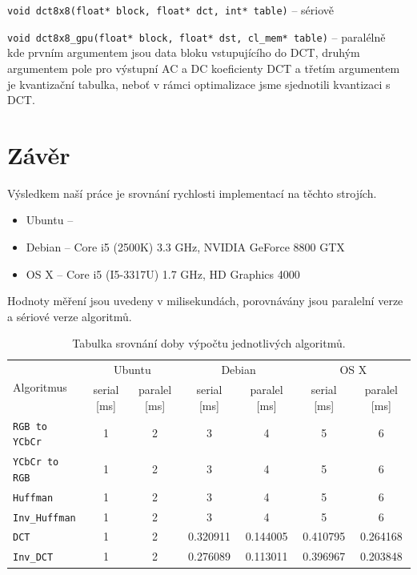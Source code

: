 \documentclass[a4paper,11pt]{article}
\begin{document}
\texttt{void dct8x8(float* block, float* dct, int* table)} -- sériově

\texttt{void dct8x8\_gpu(float* block, float* dst, cl\_mem* table)} -- paralélně\\
kde prvním argumentem jsou data bloku vstupujícího do DCT, druhým argumentem pole pro výstupní AC a DC koeficienty DCT
a třetím argumentem je kvantizační tabulka, neboť v rámci optimalizace jsme sjednotili kvantizaci s DCT.


\section{Závěr}
Výsledkem naší práce je srovnání rychlosti implementací na těchto strojích.
\begin{itemize}
\item Ubuntu -- 
\item Debian -- Core i5 (2500K) 3.3 GHz, NVIDIA GeForce 8800 GTX
\item OS X -- Core i5 (I5-3317U) 1.7 GHz, HD Graphics 4000
\end{itemize}
Hodnoty měření jsou uvedeny v milisekundách, porovnávány jsou paralelní verze a sériové verze algoritmů.

\begin{table}[H]
\begin{center}
\renewcommand{\arraystretch}{1.3} %
\begin{tabular}{|l|cc|cc|cc|}\hline%
\multirow{2}{*}{Algoritmus}&\multicolumn{2}{|c|}{Ubuntu}&\multicolumn{2}{|c|}{Debian}&\multicolumn{2}{|c|}{OS X}\\
          &serial [ms]&paralel [ms]&serial [ms]&paralel [ms]&serial [ms]&paralel [ms]\\\hline%
\texttt{RGB to YCbCr}&1&2&3&4&5&6\\
\texttt{YCbCr to RGB}&1&2&3&4&5&6\\
\texttt{Huffman}     &1&2&3&4&5&6\\
\texttt{Inv\_Huffman} &1&2&3&4&5&6\\
\texttt{DCT}         &1&2&0.320911&0.144005&0.410795&0.264168\\
\texttt{Inv\_DCT}    &1&2&0.276089&0.113011&0.396967&0.203848\\
\hline
\end{tabular}
\renewcommand{\arraystretch}{1} %
\end{center}
\caption{Tabulka srovnání doby výpočtu jednotlivých algoritmů.}
\label{ps_history}
\end{table}
\end{document}
